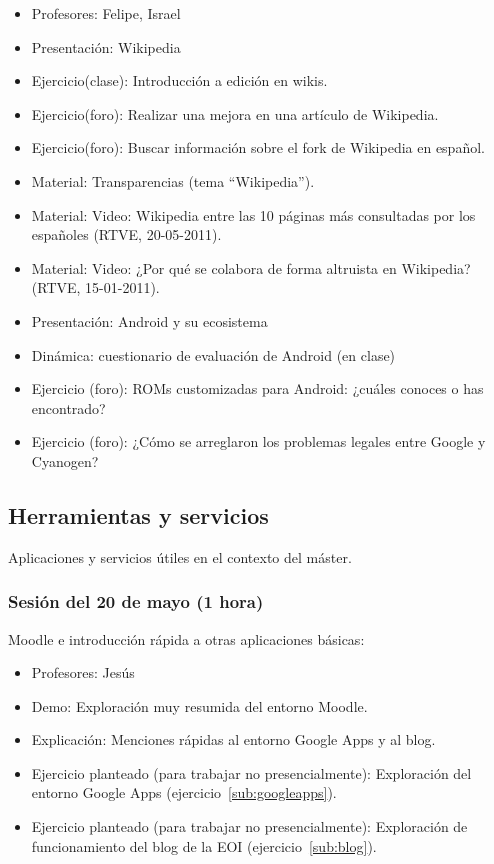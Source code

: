 \documentclass[a4paper,12pt]{article}
\begin{document}
\begin{itemize}
\item Profesores: Felipe, Israel
\item Presentación: Wikipedia
\item Ejercicio(clase): Introducción a edición en wikis.
\item Ejercicio(foro): Realizar una mejora en una artículo de Wikipedia.
\item Ejercicio(foro): Buscar información sobre el fork de Wikipedia en español.
\item Material: Transparencias (tema ``Wikipedia'').
\item Material: Video: Wikipedia entre las 10 páginas más consultadas por los 
españoles (RTVE, 20-05-2011).
\item Material: Video: ¿Por qué se colabora de forma altruista en Wikipedia? 
(RTVE, 15-01-2011).
\item Presentación: Android y su ecosistema
\item Dinámica: cuestionario de evaluación de Android (en clase)
\item Ejercicio (foro): ROMs customizadas para Android: ¿cuáles
  conoces o has encontrado?
\item Ejercicio (foro): ¿Cómo se arreglaron los problemas legales
  entre Google y Cyanogen?
\end{itemize}

\subsection{Herramientas y servicios}

Aplicaciones y servicios útiles en el contexto del máster.

\subsubsection{Sesión del 20 de mayo (1 hora)}

Moodle e introducción rápida a otras aplicaciones básicas:

\begin{itemize}
\item Profesores: Jesús
\item Demo: Exploración muy resumida del entorno Moodle.
\item Explicación: Menciones rápidas al entorno Google Apps y al blog.
\item Ejercicio planteado (para trabajar no presencialmente): Exploración del entorno Google Apps (ejercicio~\ref{sub:googleapps}).
\item Ejercicio planteado (para trabajar no presencialmente): Exploración de funcionamiento del blog de la EOI (ejercicio~\ref{sub:blog}).
\end{itemize}
\end{document}
